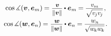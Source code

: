 \nopagebreak\vspace{-0.2em}\begin{gather*}
\operatorname{cos} \measuredangle ({\bm{v}, \bm{e}_m}) \hspace{-0.1ex}
= \scalebox{.9}{$ \displaystyle\frac{\hspace{.2ex}\raisemath{-0.16em}{\bm{v}}}{\raisemath{-0.05em}{\|\bm{v}\|}} $} \hspace{-0.1ex} \dotp \bm{e}_m \hspace{-0.1ex}
= \hspace{-0.1ex}\scalebox{.9}{$ \displaystyle\frac{\hspace{.2ex}\raisemath{-0.12em}{v_m}}{\raisemath{-0.1em}{\sqrt{\vphantom{i} v_{\hspace{-0.1ex}j} v_{\hspace{-0.1ex}j}}}} $}
\hspace{.1ex} ,
\\
%
\operatorname{cos} \measuredangle ({\bm{w}, \bm{e}_n}) \hspace{-0.1ex}
= \scalebox{.9}{$ \displaystyle\frac{\hspace{.2ex}\raisemath{-0.16em}{\bm{w}}}{\raisemath{-0.05em}{\|\bm{w}\|}} $} \hspace{-0.1ex} \dotp \bm{e}_n \hspace{-0.1ex}
= \hspace{-0.1ex}\scalebox{.9}{$ \displaystyle\frac{\hspace{.2ex}\raisemath{-0.12em}{w_n}}{\raisemath{-0.1em}{\sqrt{\vphantom{i} w_{\hspace{-0.1ex}k} w_{\hspace{-0.1ex}k}}}} $}
\hspace{.1ex} .
\end{gather*}

